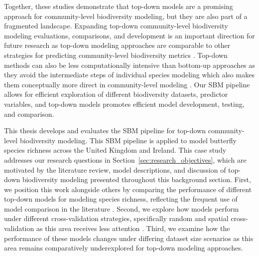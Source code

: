 Together, these studies demonstrate that top-down models are a promising approach for community-level biodiversity modeling, but they are also part of a fragmented landscape. Expanding top-down community-level biodiversity modeling evaluations, comparisons, and development is an important direction for future research \parencite{ferrier2002, ferrier2006, pollock2020} as top-down modeling approaches are comparable to other strategies for predicting community-level biodiversity metrics \parencite{biber2020, distler2015}. Top-down methods can also be less computationally intensive than bottom-up approaches \parencite{biber2020} as they avoid the intermediate steps of individual species modeling which also makes them conceptually more direct in community-level modeling \parencite{ferrier2006}. Our SBM pipeline allows for efficient exploration of different biodiversity datasets, predictor variables, and top-down models promotes efficient model development, testing, and comparison.

This thesis develops and evaluates the SBM pipeline for top-down community-level biodiversity modeling. This SBM pipeline is applied to model butterfly species richness across the United Kingdom and Ireland. This case study addresses our research questions in Section~\ref{sec:research_objectives}, which are motivated by the literature review, model descriptions, and discussion of top-down biodiversity modeling presented throughout this background section. First, we position this work alongside others by comparing the performance of different top-down models for modeling species richness, reflecting the frequent use of model comparison in the literature \parencite{brugere2023,brun2024, baggstrom2025}. Second, we explore how models perform under different cross-validation strategies, specifically random and spatial cross-validation as this area receives less attention \parencite{cai2023}. Third, we examine how the performance of these models changes under differing dataset size scenarios as this area remains comparatively underexplored for top-down modeling approaches.

